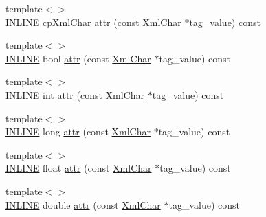 \begin{DoxyCompactItemize}
\item 
{\footnotesize template$<$$>$ }\\\hyperlink{_x_m_l_elements_8h_a2eb6f9e0395b47b8d5e3eeae4fe0c116}{I\+N\+L\+I\+NE} \hyperlink{namespace_d_d4hep_1_1_x_m_l_a55d8459973c11d7c20ba5a1d7ef1242c}{cp\+Xml\+Char} \hyperlink{class_d_d4hep_1_1_x_m_l_1_1_handle__t_a25a34516c3c3d50d7a804864b9095076}{attr} (const \hyperlink{namespace_d_d4hep_1_1_x_m_l_a09e5d9cc86ed782f6826dfe0778c1815}{Xml\+Char} $\ast$tag\+\_\+value) const
\item 
{\footnotesize template$<$$>$ }\\\hyperlink{_x_m_l_elements_8h_a2eb6f9e0395b47b8d5e3eeae4fe0c116}{I\+N\+L\+I\+NE} bool \hyperlink{class_d_d4hep_1_1_x_m_l_1_1_handle__t_ab04c2ba0c378025889ee6d0fe35d88bb}{attr} (const \hyperlink{namespace_d_d4hep_1_1_x_m_l_a09e5d9cc86ed782f6826dfe0778c1815}{Xml\+Char} $\ast$tag\+\_\+value) const
\item 
{\footnotesize template$<$$>$ }\\\hyperlink{_x_m_l_elements_8h_a2eb6f9e0395b47b8d5e3eeae4fe0c116}{I\+N\+L\+I\+NE} int \hyperlink{class_d_d4hep_1_1_x_m_l_1_1_handle__t_a1a986a491af5d828c50fba7c6dc9f10e}{attr} (const \hyperlink{namespace_d_d4hep_1_1_x_m_l_a09e5d9cc86ed782f6826dfe0778c1815}{Xml\+Char} $\ast$tag\+\_\+value) const
\item 
{\footnotesize template$<$$>$ }\\\hyperlink{_x_m_l_elements_8h_a2eb6f9e0395b47b8d5e3eeae4fe0c116}{I\+N\+L\+I\+NE} long \hyperlink{class_d_d4hep_1_1_x_m_l_1_1_handle__t_a26e54c956be05443deda9d8997c08d2e}{attr} (const \hyperlink{namespace_d_d4hep_1_1_x_m_l_a09e5d9cc86ed782f6826dfe0778c1815}{Xml\+Char} $\ast$tag\+\_\+value) const
\item 
{\footnotesize template$<$$>$ }\\\hyperlink{_x_m_l_elements_8h_a2eb6f9e0395b47b8d5e3eeae4fe0c116}{I\+N\+L\+I\+NE} float \hyperlink{class_d_d4hep_1_1_x_m_l_1_1_handle__t_a6f202b39c57b63cd9caaa3e209129a8f}{attr} (const \hyperlink{namespace_d_d4hep_1_1_x_m_l_a09e5d9cc86ed782f6826dfe0778c1815}{Xml\+Char} $\ast$tag\+\_\+value) const
\item 
{\footnotesize template$<$$>$ }\\\hyperlink{_x_m_l_elements_8h_a2eb6f9e0395b47b8d5e3eeae4fe0c116}{I\+N\+L\+I\+NE} double \hyperlink{class_d_d4hep_1_1_x_m_l_1_1_handle__t_a73550722df037e75f6ec31d07d929e72}{attr} (const \hyperlink{namespace_d_d4hep_1_1_x_m_l_a09e5d9cc86ed782f6826dfe0778c1815}{Xml\+Char} $\ast$tag\+\_\+value) const
\end{DoxyCompactItemize}
